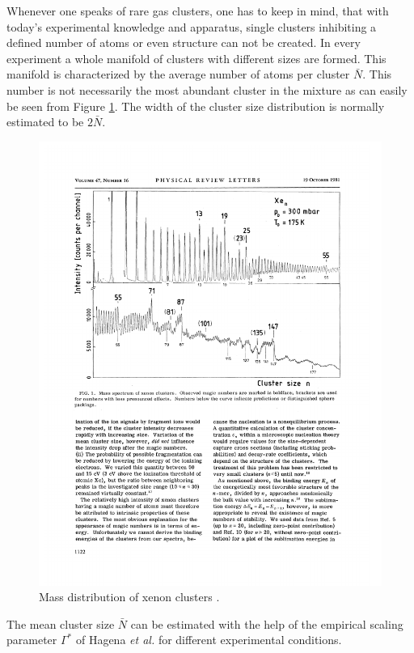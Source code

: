 Whenever one speaks of rare gas clusters, one has to keep in mind, that
with today's experimental knowledge and apparatus, single clusters
inhibiting a defined number of atoms or even structure can not be created.
In every experiment a whole manifold of clusters with different sizes are
formed. This manifold is characterized by the average number of atoms
per cluster $\bar{N}$. This number is not necessarily the most abundant
cluster in the mixture as can easily be seen from
Figure \ref{figure:Xe_cluster_mass}.
The width of the cluster size distribution is normally estimated to be
$2\bar{N}$.

\begin{figure}[h]
  \centering
  \includegraphics[scale=0.8]{pics/Xe_cluster_mass.pdf}
  \caption{Mass distribution of xenon clusters \cite{Echt81}.}
  \label{figure:Xe_cluster_mass}
\end{figure}

The mean cluster size $\bar{N}$ can be estimated with
the help of the empirical scaling parameter $\Gamma^*$ of Hagena \textit{et al.}
\cite{Hagena72,Hagena81} for different experimental conditions.

